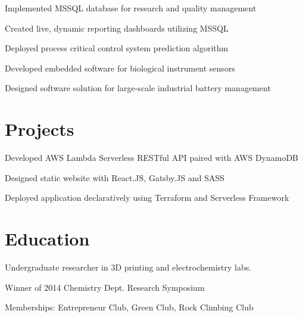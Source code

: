 \documentclass[]{bw-resume}
\begin{document}
\begin{minipage}[t]{0.66\textwidth}
\begin{tightemize}
\item Implemented MSSQL database for research and quality management
\item Created live, dynamic reporting dashboards utilizing MSSQL
\item Deployed process critical control system prediction algorithm
\end{tightemize}
\sectionsep

\begin{tightemize}
\item Developed embedded software for biological instrument sensors
\item Designed software solution for large-scale industrial battery management
\end{tightemize}
\sectionsep


\section{Projects}
\begin{tightemize}
\item Developed AWS Lambda Serverless RESTful API paired with AWS DynamoDB
\item Designed static website with React.JS, Gatsby.JS and SASS
\item Deployed application declaratively using Terraform and Serverless Framework
\end{tightemize}
\sectionsep


\section{Education}
\begin{tightemize}
\item Undergraduate researcher in 3D printing and electrochemistry labs.
\item Winner of 2014 Chemistry Dept. Research Symposium
\item Memberships: Entrepreneur Club, Green Club, Rock Climbing Club
\end{tightemize}


\end{minipage} 
\end{document}
